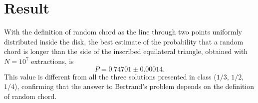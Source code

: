 \documentclass[11pt,a4paper]{article}
\begin{document}
	\section*{Result}
	
	With the definition of random chord as the line through two points uniformly distributed inside the disk, the best estimate of the probability that a random chord is longer than the side of the inscribed equilateral triangle, obtained with $N = 10^7$ extractions, is
	\begin{equation}
		P = 0.74701 \pm 0.00014 .
	\end{equation}
	This value is different from all the three solutions presented in class ($1/3$, $1/2$, $1/4$), confirming that the answer to Bertrand's problem depends on the definition of random chord.
	
	
\end{document}
